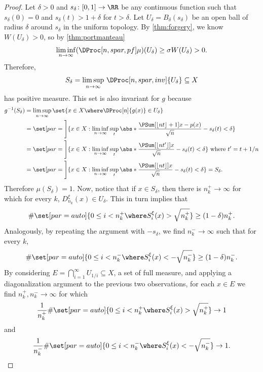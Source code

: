 \documentclass[../main]{subfiles}
\begin{document}
\begin{proof}
  Let \(\delta > 0\) and \(s_{\delta} \colon [0,1] \to \RR\) be any continuous function such that \(s_{\delta}(0) = 0\) and \(s_{\delta}(t) > 1 + \delta\) for \(t > \delta\).
  Let \(U_{\delta} = B_{\delta}(s_{\delta})\) be an open ball of radius \(\delta\) around \(s_{\delta}\) in the uniform topology. By \cref{thm:forgery}, we know \(W(U_{\delta}) > 0\), so by \cref{thm:portmanteau}
  \begin{equation*}
    \liminf_{n \to \infty}(\DProc[n,spar,pf]\mu)(U_{\delta}) \geq \sigma W(U_{\delta}) > 0.
  \end{equation*}
  Therefore,
  \begin{equation*}
    S_{\delta} = \limsup_{n \to \infty}\, \DProc[n,spar,inv]{U_{\delta}} \subseteq X
  \end{equation*}
  has positive measure. This set is also invariant for \(g\) because
  \begin{align*}
    g^{-1}(S_{\delta})
    &= \limsup_{n \to \infty} \set{x \in X \where \DProc[n]{g(x)} \in U_{\delta}}\\
    &= \set[par = \Bigg]{x \in X : \liminf_{n \to \infty} \sup_t\abs*{\frac{\PSum[\floor{nt} + 1]{x} - p(x)}{\sqrt{n}} - s_{\delta}(t)} <\delta }\\
    &= \set[par = \Bigg]{x \in X : \liminf_{n \to \infty} \sup_t\abs*{\frac{\PSum[\floor{nt'}]{x}}{\sqrt{n}} - s_{\delta}(t)} <\delta }  \text{ where }t' = t + 1/n\\
    &= \set[par = \Bigg]{x \in X : \liminf_{n \to \infty} \sup_t\abs*{\frac{\PSum[\floor{nt}]{x}}{\sqrt{n}} - s_{\delta}(t)} <\delta } = S_{\delta}.
  \end{align*}
  Therefore \(\mu(S_{\delta}) = 1\). Now, notice that if \(x \in S_{\delta}\), then there is \(n_k^+ \to \infty\) for which for every \(k\), \(D_{n_k}^{\xi}(x) \in U_{\delta}\). This in turn implies that
  \begin{align*}
    \#\set[par = auto]{ 0 \leq i < n_k^+ \where S_{i}^{\xi}(x) > \sqrt{\textstyle n^+_k} } \geq (1 - \delta)n_k^{+}.
  \end{align*}
  Analogously, by repeating the argument with \(- s_{\delta}\), we find \(n_k^- \to \infty\) such that for every \(k\),
  \begin{align*}
    \#\set[par = auto]{ 0 \leq i < n_k^- \where S_{i}^{\xi}(x) < -\sqrt{\textstyle n^-_k} } \geq (1 - \delta)n_k^{-}.
  \end{align*}
  By considering \(E = \bigcap_{i = 1}^{\infty} U_{1/i} \subseteq X\), a set of full measure, and applying a diagonalization argument to the previous two observations, for each \(x \in E\) we find \(n_k^+, n_k^- \to \infty\) for which
  \begin{equation*}
    \frac{1}{n_k^+}\#\set[par = auto]{ 0 \leq i < n_k^+ \where S_{i}^{\xi}(x) > \sqrt{\textstyle n^+_k} } \to 1
  \end{equation*}
  and
  \begin{equation}\label{eq:6}
    \frac{1}{n_k^-}\#\set[par = auto]{ 0 \leq i < n_k^- \where S_{i}^{\xi}(x) < -\sqrt{\textstyle n^-_k} } \to 1.
  \end{equation}


\end{proof}
\end{document}

